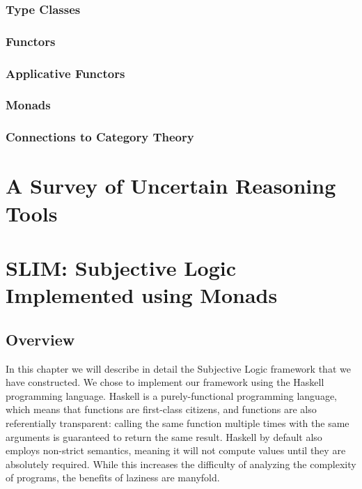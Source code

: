 \documentclass[a4paper]{report}
\begin{document}
\subsection{Type Classes}

\subsection{Functors}

\subsection{Applicative Functors}

\subsection{Monads}

\subsection{Connections to Category Theory}





\chapter{A Survey of Uncertain Reasoning Tools}











\chapter{SLIM: Subjective Logic Implemented using Monads}
\label{chap:sl-framework}

\section{Overview}

\par
In this chapter we will describe in detail the Subjective Logic framework
that we have constructed. We chose to implement our framework using the Haskell
programming language. Haskell is a purely-functional programming language, which
means that functions are first-class citizens, and functions are also referentially
transparent: calling the same function multiple times with the same arguments
is guaranteed to return the same result. Haskell by default also employs non-strict
semantics, meaning it will not compute values until they are absolutely required.
While this increases the difficulty of analyzing the complexity of programs, the
benefits of laziness are manyfold.
\end{document}
